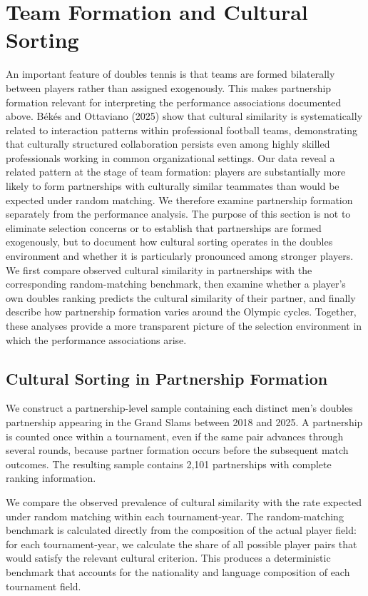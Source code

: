 \documentclass[10pt]{article}
\begin{document}
\section{Team Formation and Cultural Sorting}
An important feature of doubles tennis is that teams are formed bilaterally between players rather than assigned exogenously. This makes partnership formation relevant for interpreting the performance associations documented above. Békés and Ottaviano (2025) show that cultural similarity is systematically related to interaction patterns within professional football teams, demonstrating that culturally structured collaboration persists even among highly skilled professionals working in common organizational settings. Our data reveal a related pattern at the stage of team formation: players are substantially more likely to form partnerships with culturally similar teammates than would be expected under random matching. We therefore examine partnership formation separately from the performance analysis. The purpose of this section is not to eliminate selection concerns or to establish that partnerships are formed exogenously, but to document how cultural sorting operates in the doubles environment and whether it is particularly pronounced among stronger players. We first compare observed cultural similarity in partnerships with the corresponding random-matching benchmark, then examine whether a player's own doubles ranking predicts the cultural similarity of their partner, and finally describe how partnership formation varies around the Olympic cycles. Together, these analyses provide a more transparent picture of the selection environment in which the performance associations arise.

\subsection{Cultural Sorting in Partnership Formation}
\label{sec:sorting}


We construct a partnership-level sample containing each distinct men's doubles partnership appearing in the Grand Slams between 2018 and 2025. A partnership is counted once within a tournament, even if the same pair advances through several rounds, because partner formation occurs before the subsequent match outcomes. The resulting sample contains 2,101 partnerships with complete ranking information.

We compare the observed prevalence of cultural similarity with the rate expected under random matching within each tournament-year. The random-matching benchmark is calculated directly from the composition of the actual player field: for each tournament-year, we calculate the share of all possible player pairs that would satisfy the relevant cultural criterion. This produces a deterministic benchmark that accounts for the nationality and language composition of each tournament field.
\end{document}

